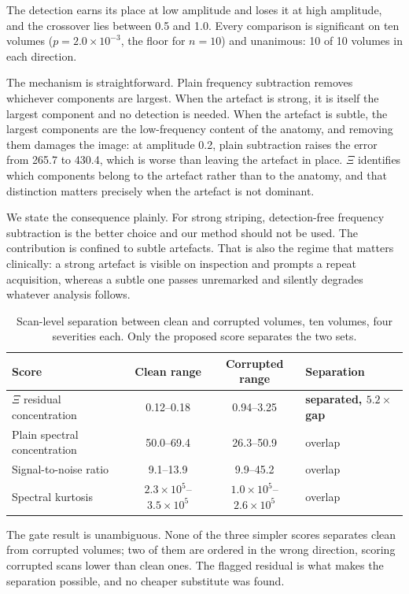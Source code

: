 \documentclass[12pt]{article}
\theoremstyle{definition}
\theoremstyle{plain}
\begin{document}
The detection earns its place at low amplitude and loses it at high amplitude, and
the crossover lies between 0.5 and 1.0. Every comparison is significant on ten
volumes ($p = 2.0\times10^{-3}$, the floor for $n=10$) and unanimous: 10 of 10
volumes in each direction.

The mechanism is straightforward. Plain frequency subtraction removes whichever
components are largest. When the artefact is strong, it is itself the largest
component and no detection is needed. When the artefact is subtle, the largest
components are the low-frequency content of the anatomy, and removing them damages
the image: at amplitude 0.2, plain subtraction raises the error from 265.7 to 430.4,
which is worse than leaving the artefact in place. $\Xi$ identifies which components
belong to the artefact rather than to the anatomy, and that distinction matters
precisely when the artefact is not dominant.

We state the consequence plainly. For strong striping, detection-free frequency
subtraction is the better choice and our method should not be used. The contribution
is confined to subtle artefacts. That is also the regime that matters clinically: a
strong artefact is visible on inspection and prompts a repeat acquisition, whereas a
subtle one passes unremarked and silently degrades whatever analysis follows.

\begin{table}[H]
\centering
\caption{Scan-level separation between clean and corrupted volumes, ten volumes,
four severities each. Only the proposed score separates the two sets.}
\begin{tabular}{lccl}
\toprule
Score & Clean range & Corrupted range & Separation \\
\midrule
$\Xi$ residual concentration & 0.12--0.18 & 0.94--3.25 & \textbf{separated, $5.2\times$ gap} \\
Plain spectral concentration & 50.0--69.4 & 26.3--50.9 & overlap \\
Signal-to-noise ratio & 9.1--13.9 & 9.9--45.2 & overlap \\
Spectral kurtosis & $2.3\times10^{5}$--$3.5\times10^{5}$ & $1.0\times10^{5}$--$2.6\times10^{5}$ & overlap \\
\bottomrule
\end{tabular}
\end{table}

The gate result is unambiguous. None of the three simpler scores separates clean from
corrupted volumes; two of them are ordered in the wrong direction, scoring corrupted
scans lower than clean ones. The flagged residual is what makes the separation
possible, and no cheaper substitute was found.
\end{document}
